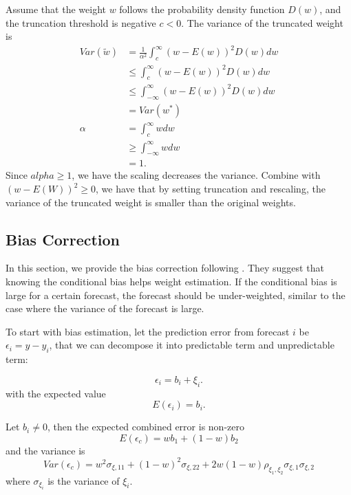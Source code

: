 \documentclass[11pt]{article}
\begin{document}
Assume that the weight $w$ follows the probability density function $D(w)$, and the truncation threshold is negative $c<0$. The variance of the truncated weight is
\begin{equation}
\label{eqn: var trunc}
\begin{aligned}
Var(\tilde{w}) &= \frac{1}{\alpha^2} \int_{c}^{\infty} (w-E(w))^2 D(w) dw\\
&\leq \int_{c}^{\infty} (w-E(w))^2 D(w) dw\\
&\leq \int_{-\infty}^{\infty} (w-E(w))^2 D(w) dw\\
&=Var(w^*)\\
\alpha &= \int_{c}^{\infty} w dw\\
&\geq \int_{-\infty}^{\infty} w dw\\
&=1.
\end{aligned}
\end{equation}
Since $alpha \geq 1$, we have the scaling decreases the variance. Combine with $(w-E(W))^2 \geq 0$, we have that by setting truncation and rescaling, the variance of the truncated weight is smaller than the original weights.

\subsection{Bias Correction}\label{bias-correction}
In this section, we provide the bias correction following \cite{Gibbs2017}. They suggest that knowing the conditional bias helps weight estimation. If the conditional bias is large for a certain forecast, the forecast should be under-weighted, similar to the case where the variance of the forecast is large.

To start with bias estimation, let the prediction error from forecast \(i\) be \(\epsilon_i = y - y_i\), that we can decompose it into predictable term and unpredictable term:

\begin{equation}
\label{eqn: w bias assumption}
\epsilon_i = b_i + \xi_i. 
\end{equation}
with the expected value
\begin{equation}
\label{eqn: bias estimate}
E(\epsilon_i) = b_i.
\end{equation}

Let $b_i \neq 0$, then the expected combined error is non-zero
\begin{equation}
E(\epsilon_c) = wb_1+(1-w)b_2
\end{equation}
and the variance is
\begin{equation}
Var(\epsilon_c) = w^2\sigma_{\xi,11} + (1-w)^2\sigma_{\xi,22} + 2w(1-w)\rho_{\xi_1,\xi_2}\sigma_{\xi,1}\sigma_{\xi,2}
\end{equation}
where $\sigma_{\xi_i}$ is the variance of $\xi_i$.
\end{document}
